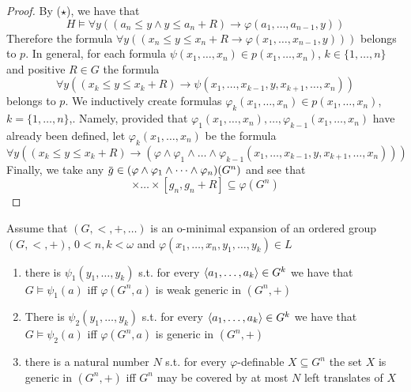 \documentclass[11pt]{article}
\begin{document}
\begin{proof}
By (\(\star\)), we have that
\begin{equation*}
H\vDash\forall y((a_n\le y\wedge y\le a_n+R)\to\varphi(a_1,\dots,a_{n-1},y))
\end{equation*}
Therefore the formula \(\forall y((x_n\le y\le x_n+R\to\varphi(x_1,\dots,x_{n-1},y)))\) belongs to \(p\). In general,
for each formula \(\psi(x_1,\dots,x_n)\in p(x_1,\dots,x_n)\), \(k\in\{1,\dots,n\}\) and positive \(R\in G\) the formula
\begin{equation*}
\forall y((x_k\le y\le x_k+R)\to\psi(x_1,\dots,x_{k-1},y,x_{k+1},\dots,x_n))
\end{equation*}
belongs to \(p\). We inductively create formulas \(\varphi_k(x_1,\dots,x_n)\in p(x_1,\dots,x_n)\), \(k=\{1,\dots,n\}\),.
Namely, provided that \(\varphi_1(x_1,\dots,x_n),\dots,\varphi_{k-1}(x_1,\dots,x_n)\) have already been defined,
let \(\varphi_k(x_1,\dots,x_n)\) be the formula
\begin{equation*}
\forall y((x_k\le y\le x_k+R)\to(\varphi\wedge\varphi_1\wedge\dots\wedge\varphi_{k-1}(x_1,\dots,x_{k-1},y,x_{k+1},\dots,x_n)))
\end{equation*}
Finally, we take any \(\barg\in(\varphi\wedge\varphi_1\wedge\dots\wedge\varphi_n)(G^n)\) and see that
\begin{equation*}
[g_1,g_1+R]\times\dots\times[g_n,g_n+R]\subseteq\varphi(G^n)
\end{equation*}
\end{proof}

\begin{corollary}[3.3.5]
\label{3.3.5}
Assume that \((G,<,+,\dots)\) is an o-minimal expansion of an ordered group \((G,<,+)\), \(0<n,k<\omega\)
and \(\varphi(x_1,\dots,x_n,y_1,\dots,y_k)\in L\)
\begin{enumerate}
\item there is \(\psi_1(y_1,\dots,y_k)\) s.t. for every \(\langle a_1,\dots,a_k\rangle\in G^k\) we have that \(G\vDash\psi_1(a)\)
iff \(\varphi(G^n,a)\) is weak generic in \((G^n,+)\)
\item There is \(\psi_2(y_1,\dots,y_k)\) s.t. for every \(\langle a_1,\dots,a_k\rangle\in G^k\) we have that \(G\vDash\psi_2(a)\)
iff \(\varphi(G^n,a)\) is generic in \((G^n,+)\)
\item there is a natural number \(N\) s.t. for every \(\varphi\)-definable \(X\subseteq G^n\) the set \(X\) is generic
in \((G^n,+)\) iff \(G^n\) may be covered by at most \(N\) left translates of \(X\)
\end{enumerate}
\end{corollary}
\end{document}
